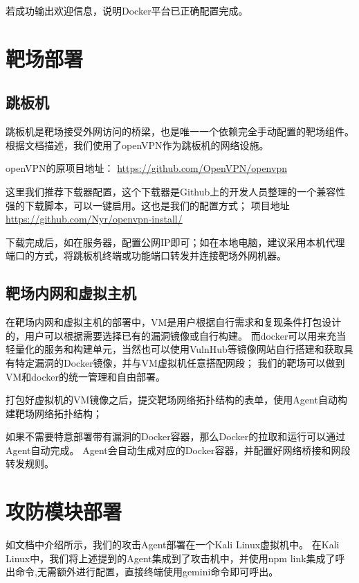 \documentclass[lang=cn,10pt]{elegantbook}
\begin{document}
若成功输出欢迎信息，说明Docker平台已正确配置完成。


\section{靶场部署}

\subsection{跳板机}

跳板机是靶场接受外网访问的桥梁，也是唯一一个依赖完全手动配置的靶场组件。根据文档描述，我们使用了openVPN作为跳板机的网络设施。

openVPN的原项目地址：
\href{https://github.com/OpenVPN/openvpn}{https://github.com/OpenVPN/openvpn}

这里我们推荐下载器配置，这个下载器是Github上的开发人员整理的一个兼容性强的下载脚本，可以一键启用。这也是我们的配置方式；
项目地址
\href{https://github.com/Nyr/openvpn-install/}{https://github.com/Nyr/openvpn-install/}

下载完成后，如在服务器，配置公网IP即可；如在本地电脑，建议采用本机代理端口的方式，将跳板机终端或功能端口转发并连接靶场外网机器。


\subsection{靶场内网和虚拟主机}

在靶场内网和虚拟主机的部署中，VM是用户根据自行需求和复现条件打包设计的，用户可以根据需要选择已有的漏洞镜像或自行构建。
而docker可以用来充当轻量化的服务和构建单元，当然也可以使用VulnHub等镜像网站自行搭建和获取具有特定漏洞的Docker镜像，并与VM虚拟机任意搭配网段；
我们的靶场可以做到VM和docker的统一管理和自由部署。

打包好虚拟机的VM镜像之后，提交靶场网络拓扑结构的表单，使用Agent自动构建靶场网络拓扑结构；

如果不需要特意部署带有漏洞的Docker容器，那么Docker的拉取和运行可以通过Agent自动完成。
Agent会自动生成对应的Docker容器，并配置好网络桥接和网段转发规则。



\section{攻防模块部署}

如文档中介绍所示，我们的攻击Agent部署在一个Kali Linux虚拟机中。
在Kali Linux中，我们将上述提到的Agent集成到了攻击机中，并使用npm link集成了呼出命令,无需额外进行配置，直接终端使用gemini命令即可呼出。
\end{document}
